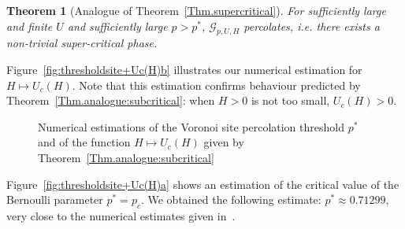 \documentclass[10pt,a4paper]{amsart}
\theoremstyle{exampstyle}
\newtheorem{Theorem}{Theorem}
\theoremstyle{exampnotations}
\begin{document}
\begin{Theorem}[Analogue of Theorem~\ref{Thm.supercritical}]
\label{Thm.analogue:supercritical}
For sufficiently large and finite $U$ and sufficiently large $p>p^*$, $\mathcal{G}_{p,U,H}$ percolates, i.e. there exists a non-trivial super-critical phase.
\end{Theorem}
Figure~\ref{fig:thresholdsite+Uc(H)b} illustrates our numerical estimation for $H \mapsto U_c(H)$. Note that this estimation confirms behaviour predicted by Theorem~\ref{Thm.analogue:subcritical}: when $H>0$ is not too small, $U_c(H)>0$. 
\begin{figure}[h!]
\centering
\setlength{\lineskip}{\medskipamount}
\hfill
{}\hfill
\caption{Numerical estimations of the Voronoi site percolation threshold $p^*$ and of the function $H \mapsto U_c(H)$ given by Theorem~\ref{Thm.analogue:subcritical}} \label{fig:thresholdsite+Uc(H)}
\end{figure}
Figure~\ref{fig:thresholdsite+Uc(H)a} shows an estimation of the critical value of the Bernoulli parameter $p^*=p_c$. We obtained the following estimate: $p^* \approx 0.71299$, very close to the numerical estimates given in~\cite{becker_percolation_2009,neher2008topological}. \\
\end{document}
